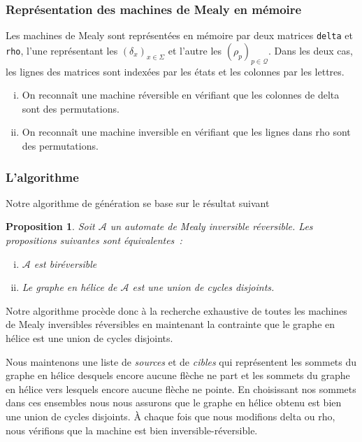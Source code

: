 \documentclass[11pt,a4paper]{article}
\newtheorem{prop}{Proposition}
\begin{document}
\subsubsection*{Représentation des machines de Mealy en mémoire}
Les machines de Mealy sont représentées en mémoire par deux matrices \lstinline$delta$ et \lstinline{rho}, l'une représentant les $(\delta_x)_{x\in\Sigma}$ et l'autre les $(\rho_p)_{p\in\mathcal{Q}}$. Dans les deux cas, les lignes des matrices sont indexées par les états et les colonnes par les lettres.

\begin{enumerate}[(i)]
\item On reconnaît une machine réversible en vérifiant que les colonnes de \textrm{delta}  sont des permutations.
\item On reconnaît une machine inversible en vérifiant que les lignes dans \textrm{rho} sont des permutations.
\end{enumerate}

\subsubsection*{L'algorithme}
Notre algorithme de génération se base sur le résultat suivant

\begin{prop}{\cite{DBLP:journals/corr/abs-1105-4725}}
  \label{thm:ir-helix}
  Soit $\mathcal{A}$ un automate de Mealy inversible réversible. Les propositions suivantes sont équivalentes~:

  \begin{enumerate}[(i)]
  \item $\mathcal{A}$ est biréversible
  \item Le graphe en hélice de $\mathcal{A}$ est une union de cycles disjoints.
  \end{enumerate}
\end{prop}

Notre algorithme procède donc à la recherche exhaustive de toutes les machines de Mealy inversibles réversibles en maintenant la contrainte que le graphe en hélice est une union de cycles disjoints.

Nous maintenons une liste de \textit{sources} et de \textit{cibles} qui représentent les sommets du graphe en hélice desquels encore aucune flèche ne part et les sommets du graphe en hélice vers lesquels encore aucune flèche ne pointe. En choisissant nos sommets dans ces ensembles nous nous assurons que le graphe en hélice obtenu est bien une union de cycles disjoints. À chaque fois que nous modifions \textrm{delta} ou \textrm{rho}, nous vérifions que la machine est bien inversible-réversible.
\end{document}
